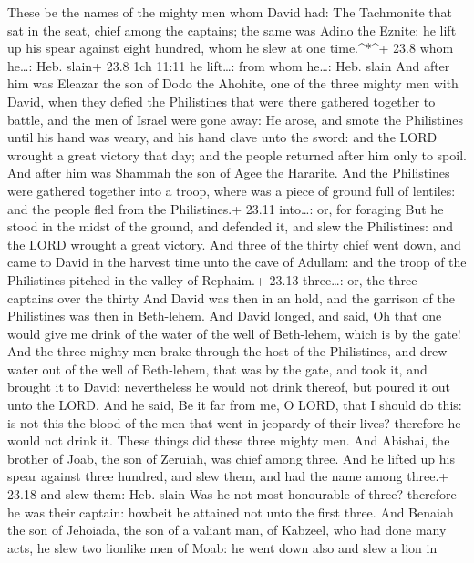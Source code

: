  These be the names of the mighty men whom David had: The
Tachmonite that sat in the seat, chief among the captains; the same was
Adino the Eznite: he lift up his spear against eight hundred, whom he
slew at one time.\^{}*\^{}+ 23.8 whom he\ldots: Heb. slain+ 23.8 1ch
11:11 he lift\ldots: from whom he\ldots: Heb. slain  And
after him was Eleazar the son of Dodo the Ahohite, one of the three
mighty men with David, when they defied the Philistines that were there
gathered together to battle, and the men of Israel were gone away:
 He arose, and smote the Philistines until his hand was
weary, and his hand clave unto the sword: and the LORD wrought a great
victory that day; and the people returned after him only to spoil.
 And after him was Shammah the son of Agee the Hararite.
And the Philistines were gathered together into a troop, where was a
piece of ground full of lentiles: and the people fled from the
Philistines.+ 23.11 into\ldots: or, for foraging  But he
stood in the midst of the ground, and defended it, and slew the
Philistines: and the LORD wrought a great victory.  And
three of the thirty chief went down, and came to David in the harvest
time unto the cave of Adullam: and the troop of the Philistines pitched
in the valley of Rephaim.+ 23.13 three\ldots: or, the three captains
over the thirty  And David was then in an hold, and the
garrison of the Philistines was then in Beth-lehem.  And
David longed, and said, Oh that one would give me drink of the water of
the well of Beth-lehem, which is by the gate!  And the
three mighty men brake through the host of the Philistines, and drew
water out of the well of Beth-lehem, that was by the gate, and took it,
and brought it to David: nevertheless he would not drink thereof, but
poured it out unto the LORD.  And he said, Be it far from
me, O LORD, that I should do this: is not this the blood of the men that
went in jeopardy of their lives? therefore he would not drink it. These
things did these three mighty men.  And Abishai, the
brother of Joab, the son of Zeruiah, was chief among three. And he
lifted up his spear against three hundred, and slew them, and had the
name among three.+ 23.18 and slew them: Heb. slain  Was he
not most honourable of three? therefore he was their captain: howbeit he
attained not unto the first three.  And Benaiah the son of
Jehoiada, the son of a valiant man, of Kabzeel, who had done many acts,
he slew two lionlike men of Moab: he went down also and slew a lion in
